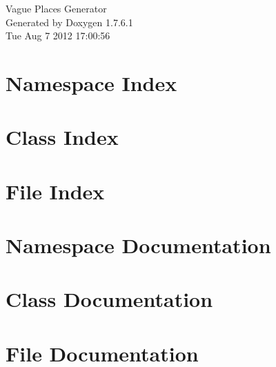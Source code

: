 \documentclass[a4paper]{book}
\begin{document}
\hypersetup{pageanchor=false,citecolor=blue}
\begin{titlepage}
\vspace*{7cm}
\begin{center}
{\Large \-Vague \-Places \-Generator }\\
\vspace*{1cm}
{\large \-Generated by Doxygen 1.7.6.1}\\
\vspace*{0.5cm}
{\small Tue Aug 7 2012 17:00:56}\\
\end{center}
\end{titlepage}
\clearemptydoublepage
{}
\tableofcontents
\clearemptydoublepage
{}
\hypersetup{pageanchor=true,citecolor=blue}
\chapter{\-Namespace \-Index}

\chapter{\-Class \-Index}

\chapter{\-File \-Index}

\chapter{\-Namespace \-Documentation}






\chapter{\-Class \-Documentation}




\chapter{\-File \-Documentation}






\printindex
\end{document}
